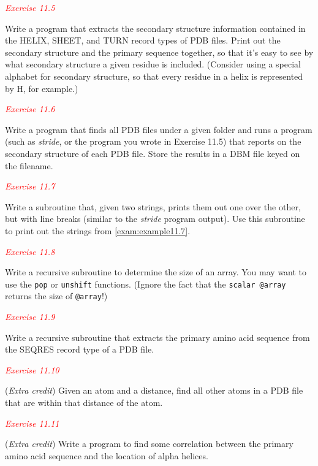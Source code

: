 \textcolor{red}{\textit{Exercise 11.5}}
\begin{adjustwidth}{1cm}{}
Write a program that extracts the secondary structure information contained in the HELIX, SHEET, and TURN record types of PDB files. Print out the secondary structure and the primary sequence together, so that it's easy to see by what secondary structure a given residue is included. (Consider using a special alphabet for secondary structure, so that every residue in a helix is represented by H, for example.)
\end{adjustwidth}

\textcolor{red}{\textit{Exercise 11.6}}
\begin{adjustwidth}{1cm}{}
Write a program that finds all PDB files under a given folder and runs a program (such as \textit{stride}, or the program you wrote in Exercise 11.5) that reports on the secondary structure of each PDB file. Store the results in a DBM file keyed on the filename.
\end{adjustwidth}

\textcolor{red}{\textit{Exercise 11.7}}
\begin{adjustwidth}{1cm}{}
Write a subroutine that, given two strings, prints them out one over the other, but with line breaks (similar to the \textit{stride} program output). Use this subroutine to print out the strings from \autoref{exam:example11.7}. 
\end{adjustwidth}

\textcolor{red}{\textit{Exercise 11.8}}
\begin{adjustwidth}{1cm}{}
Write a recursive subroutine to determine the size of an array. You may want to use the \verb|pop| or \verb|unshift| functions. (Ignore the fact that the \verb|scalar @array| returns the size of \verb|@array|!)
\end{adjustwidth}

\textcolor{red}{\textit{Exercise 11.9}}
\begin{adjustwidth}{1cm}{}
Write a recursive subroutine that extracts the primary amino acid sequence from the SEQRES record type of a PDB file. 
\end{adjustwidth}

\textcolor{red}{\textit{Exercise 11.10}}
\begin{adjustwidth}{1cm}{}
(\textit{Extra credit}) Given an atom and a distance, find all other atoms in a PDB file that are within that distance of the atom. 
\end{adjustwidth}

\textcolor{red}{\textit{Exercise 11.11}}
\begin{adjustwidth}{1cm}{}
(\textit{Extra credit}) Write a program to find some correlation between the primary amino acid sequence and the location of alpha helices. 
\end{adjustwidth}

